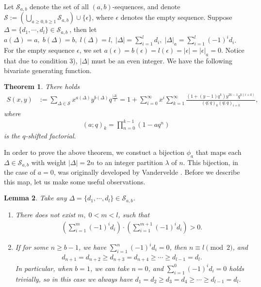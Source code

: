 \documentclass[12pt,reqno]{amsart}
\numberwithin{equation}{section}
\theoremstyle{plain}
\newtheorem{theorem}{Theorem}[section]
\newtheorem{lemma}[theorem]{Lemma}
\theoremstyle{definition}
\newcommand{\s}{\mathcal{S}}
\begin{document}
Let $\s_{a,b}$ denote the set of all $(a,b)$-sequences, and denote $\s:=\left(\bigcup_{a\ge 0, b\ge 1}\s_{a,b}\right)\cup \{\epsilon\}$, where $\epsilon$ denotes the empty sequence. Suppose $\Delta=\{d_1,\cdots,d_l\}\in \s_{a,b}~$, then let $a(\Delta)=a,\; b(\Delta)=b,\; l(\Delta)=l,\; |\Delta|=\sum_{i=1}^{l}d_i,\; |\Delta|_a=\sum_{i=1}^{l}(-1)^id_i$. For the empty sequence $\epsilon$, we set $a(\epsilon)=b(\epsilon)=l(\epsilon)=|\epsilon|=|\epsilon|_a=0$. Notice that due to condition 3), $|\Delta|$ must be an even integer. We have the following bivariate generating function.

\begin{theorem}\label{gf: abseq}
There holds
\begin{align}\label{id: abseq}
S(x,y) & :=\sum_{\Delta\in\s}x^{a(\Delta)}y^{b(\Delta)}q^{\frac{|\Delta|}{2}}=1+\sum_{i=0}^{\infty}x^i\sum_{k=1}^{\infty}\frac{(1+(y-1)q^k)y^{2k-1}q^{k(i+k)}}
{(q;q)_k(q;q)_{i+k}},
\end{align}
where
\begin{align*}
(a;q)_{k}=\prod_{n=0}^{k-1}(1-aq^{n})
\end{align*}
is the $q$-shifted factorial.
\end{theorem}

In order to prove the above theorem, we constuct a bijection $\phi_a$ that maps each $\Delta\in \s_{a,b}$ with weight $|\Delta|=2n$ to an integer partition $\lambda$ of $n$. This bijection, in the case of $a=0$, was originally developed by Vandervelde \cite{Van}. Before we describe this map, let us make some useful observations.

\begin{lemma}\label{fillup}
Take any $\Delta=\{d_1,\cdots,d_l\}\in\s_{a,b}$.
\begin{enumerate}
\item There does not exist $m,\; 0<m<l$, such that
\begin{align}\label{same sign}
\left(\sum_{i=1}^{m}(-1)^i d_i\right)\cdot\left(\sum_{i=1}^{m+1}(-1)^i d_i\right)>0.
\end{align}
\item If for some $n\ge b-1$, we have $\sum_{i=1}^{n}(-1)^i d_i=0$, then $n\equiv l \pmod 2$, and
\begin{align}\label{pair}
d_{n+1}=d_{n+2}\ge d_{n+3}=d_{n+4}\ge \cdots \ge d_{l-1}=d_l.
\end{align}
In particular, when $b=1$, we can take $n=0$, and $\sum_{i=1}^{0}(-1)^i d_i=0$ holds trivially, so in this case we always have $d_1=d_2\ge d_3=d_4\ge \cdots \ge d_{l-1}=d_l$.
\end{enumerate}
\end{lemma}
\end{document}
